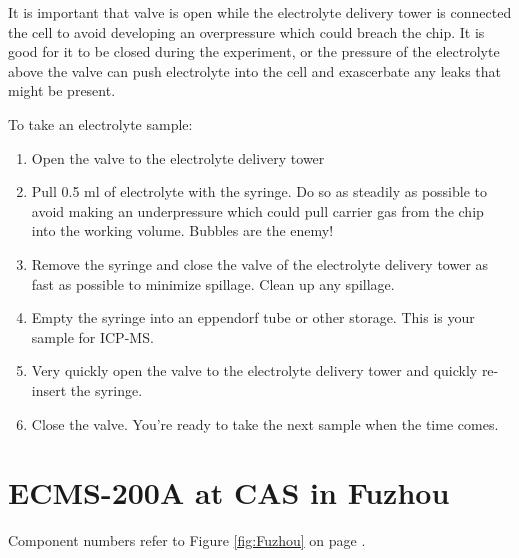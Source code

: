 It is important that valve is open while the electrolyte delivery tower is connected the cell to avoid developing an overpressure which could breach the chip. It is good for it to be closed during the experiment, or the pressure of the electrolyte above the valve can push electrolyte into the cell and exascerbate any leaks that might be present.

To take an electrolyte sample:
\begin{enumerate}
\item Open the valve to the electrolyte delivery tower

\item Pull 0.5 ml of electrolyte with the syringe. Do so as steadily as possible to avoid making an underpressure which could pull carrier gas from the chip into the working volume. Bubbles are the enemy!

\item Remove the syringe and close the valve of the electrolyte delivery tower as fast as possible to minimize spillage. Clean up any spillage.

\item Empty the syringe into an eppendorf tube or other storage. This is your sample for ICP-MS.

\item Very quickly open the valve to the electrolyte delivery tower and quickly re-insert the syringe.

\item Close the valve. You're ready to take the next sample when the time comes.
\end{enumerate}


\section{ECMS-200A at CAS in Fuzhou}\label{app:Fuzhou}

Component numbers refer to Figure \ref{fig:Fuzhou} on page \pageref{fig:Fuzhou}.

